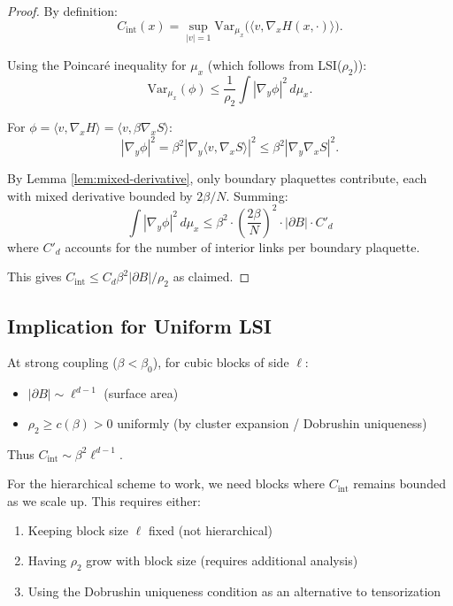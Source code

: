 \begin{proof}
By definition:
\begin{equation}
    C_{\mathrm{int}}(x) = \sup_{|v|=1} \mathrm{Var}_{\mu_x}\big(\langle v, \nabla_x H(x,\cdot) \rangle\big).
\end{equation}

Using the Poincar\'e inequality for $\mu_x$ (which follows from LSI($\rho_2$)):
\begin{equation}
    \mathrm{Var}_{\mu_x}(\phi) \leq \frac{1}{\rho_2} \int |\nabla_y \phi|^2 \, d\mu_x.
\end{equation}

For $\phi = \langle v, \nabla_x H \rangle = \langle v, \beta \nabla_x S \rangle$:
\begin{equation}
    |\nabla_y \phi|^2 = \beta^2 \left| \nabla_y \langle v, \nabla_x S \rangle \right|^2 \leq \beta^2 |\nabla_y \nabla_x S|^2.
\end{equation}

By Lemma \ref{lem:mixed-derivative}, only boundary plaquettes contribute, each with mixed derivative bounded by $2\beta/N$. Summing:
\begin{equation}
    \int |\nabla_y \phi|^2 \, d\mu_x \leq \beta^2 \cdot \left( \frac{2\beta}{N} \right)^2 \cdot |\partial B| \cdot C'_d
\end{equation}
where $C'_d$ accounts for the number of interior links per boundary plaquette.

This gives $C_{\mathrm{int}} \leq C_d \beta^2 |\partial B| / \rho_2$ as claimed.
\end{proof}

\subsection{Implication for Uniform LSI}

\begin{corollary}\label{cor:uniform-strong}
At strong coupling ($\beta < \beta_0$), for cubic blocks of side $\ell$:
\begin{itemize}
    \item $|\partial B| \sim \ell^{d-1}$ (surface area)
    \item $\rho_2 \geq c(\beta) > 0$ uniformly (by cluster expansion / Dobrushin uniqueness)
\end{itemize}
Thus $C_{\mathrm{int}} \sim \beta^2 \ell^{d-1}$.

For the hierarchical scheme to work, we need blocks where $C_{\mathrm{int}}$ remains bounded as we scale up. This requires either:
\begin{enumerate}
    \item Keeping block size $\ell$ fixed (not hierarchical)
    \item Having $\rho_2$ grow with block size (requires additional analysis)
    \item Using the Dobrushin uniqueness condition as an alternative to tensorization
\end{enumerate}
\end{corollary}

